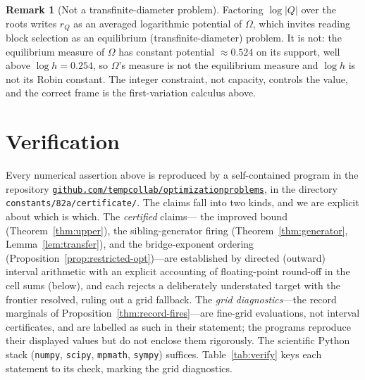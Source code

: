 \documentclass[11pt,reqno]{amsart}
\theoremstyle{plain}
\theoremstyle{definition}
\newtheorem{remark}[theorem]{Remark}
\newcommand{\rQ}{r_Q}
\newcommand{\repo}{\href{https://github.com/tempcollab/optimizationproblems/tree/main/constants/82a}{\texttt{github.com/tempcollab/optimizationproblems}}}
\begin{document}
\begin{remark}[Not a transfinite-diameter problem]\label{rem:noteq}
Factoring $\log|Q|$ over the roots writes $\rQ$ as an averaged logarithmic potential
of $\Omega$, which invites reading block selection as an equilibrium
(transfinite-diameter) problem. It is not: the equilibrium measure of $\Omega$ has
constant potential $\approx0.524$ on its support, well above $\log h=0.254$, so
$\Omega$'s measure is not the equilibrium measure and $\log h$ is not its Robin
constant. The integer constraint, not capacity, controls the value, and the correct
frame is the first-variation calculus above.
\end{remark}

\section{Verification}\label{sec:verify}

Every numerical assertion above is reproduced by a self-contained program in the
repository \repo, in the directory \texttt{constants/82a/certificate/}. The claims fall
into two kinds, and we are explicit about which is which. The \emph{certified} claims---
the improved bound (Theorem~\ref{thm:upper}), the sibling-generator firing
(Theorem~\ref{thm:generator}, Lemma~\ref{lem:transfer}), and the bridge-exponent ordering
(Proposition~\ref{prop:restricted-opt})---are established by directed (outward) interval
arithmetic with an explicit accounting of floating-point round-off in the cell sums
(below), and each rejects a deliberately understated target with the frontier resolved,
ruling out a grid fallback. The \emph{grid diagnostics}---the record marginals of
Proposition~\ref{thm:record-fires}---are fine-grid evaluations, not interval certificates,
and are labelled as such in their statement; the programs reproduce their displayed
values but do not enclose them rigorously. The scientific Python stack
(\texttt{numpy}, \texttt{scipy}, \texttt{mpmath}, \texttt{sympy}) suffices.
Table~\ref{tab:verify} keys each statement to its check, marking the grid diagnostics.
\end{document}
